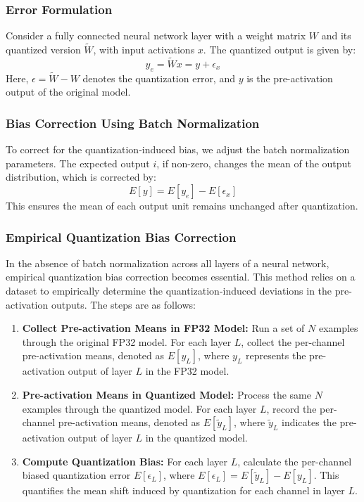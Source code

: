 \documentclass[10pt]{article}
\begin{document}
\subsubsection{Error Formulation}
Consider a fully connected neural network layer with a weight matrix \( W \) and its quantized version \( \tilde{W} \), with input activations \( x \). The quantized output is given by:
\begin{equation}
    y_e = \tilde{W} x = y + \epsilon_x
\end{equation}
Here, \( \epsilon = \tilde{W} - W \) denotes the quantization error, and \( y \) is the pre-activation output of the original model.

\subsubsection{Bias Correction Using Batch Normalization}
To correct for the quantization-induced bias, we adjust the batch normalization parameters. The expected output \( i \), if non-zero, changes the mean of the output distribution, which is corrected by:
\begin{equation}
    E[y] = E[y_e] - E[\epsilon_x]
\end{equation}
This ensures the mean of each output unit remains unchanged after quantization.

\subsubsection{Empirical Quantization Bias Correction}
In the absence of batch normalization across all layers of a neural network, empirical quantization bias correction becomes essential. This method relies on a dataset to empirically determine the quantization-induced deviations in the pre-activation outputs. The steps are as follows:
\begin{enumerate}
    \item \textbf{Collect Pre-activation Means in FP32 Model:} Run a set of \( N \) examples through the original FP32 model. For each layer \( L \), collect the per-channel pre-activation means, denoted as \( E[y_L] \), where \( y_L \) represents the pre-activation output of layer \( L \) in the FP32 model.
    
    \item \textbf{Pre-activation Means in Quantized Model:} Process the same \( N \) examples through the quantized model. For each layer \( L \), record the per-channel pre-activation means, denoted as \( E[\tilde{y}_L] \), where \( \tilde{y}_L \) indicates the pre-activation output of layer \( L \) in the quantized model.

    \item \textbf{Compute Quantization Bias:} For each layer \( L \), calculate the per-channel biased quantization error \( E[\epsilon_L] \), where \( E[\epsilon_L] = E[\tilde{y}_L] - E[y_L] \). This quantifies the mean shift induced by quantization for each channel in layer \( L \).
\end{enumerate}
\end{document}
